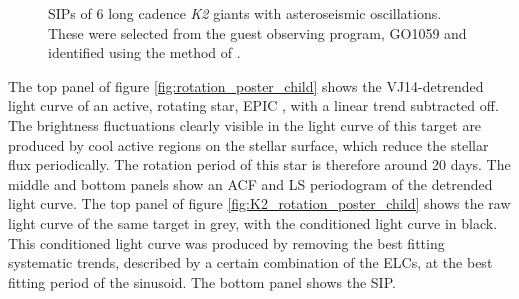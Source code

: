 \begin{figure}
\begin{center}
{        }
    \end{center}
    \caption[SIPs of oscillating red giants.]
{SIPs of 6 long cadence {\it K2} giants with asteroseismic
	    oscillations.
	    These were selected from the guest observing program, GO1059 and
	    identified using the method of \citet{Huber2009}.
\label{fig:astero_examples}}
\end{figure}

The top panel of figure \ref{fig:rotation_poster_child} shows the
VJ14-detrended light curve of an active, rotating star, EPIC \rpc, with
a linear trend subtracted off.
The brightness fluctuations clearly visible in the light curve of this target
are produced by cool active regions on the stellar surface, which reduce
the stellar flux periodically.
The rotation period of this star is therefore around 20 days.
The middle and bottom panels show an ACF and LS periodogram of the
detrended light curve.
The top panel of figure \ref{fig:K2_rotation_poster_child} shows the raw light
curve of the same target in grey,  with the conditioned light curve in black.
This conditioned light curve was produced by removing the best fitting
systematic trends, described by a certain combination of the ELCs, at the best
fitting period of the sinusoid.
The bottom panel shows the SIP.


